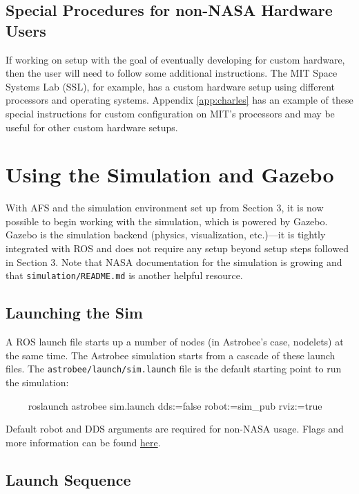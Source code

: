 \documentclass{article}
\begin{document}
\subsection{Special Procedures for non-NASA Hardware Users}

If working on setup with the goal of eventually developing for custom hardware, then the user will need to follow some additional instructions. The MIT Space Systems Lab (SSL), for example, has a custom hardware setup using different processors and operating systems. Appendix \ref{app:charles} has an example of these special instructions for custom configuration on MIT's processors and may be useful for other custom hardware setups. 

\newpage
\section{Using the Simulation and Gazebo}

With AFS and the simulation environment set up from Section 3, it is now possible to begin working with the simulation, which is powered by Gazebo. Gazebo is the simulation backend (physics, visualization, etc.)---it is tightly integrated with ROS and does not require any setup beyond setup steps followed in Section 3. Note that NASA documentation for the simulation is growing and that \texttt{simulation/README.md} is another helpful resource.


\subsection{Launching the Sim}

A ROS launch file starts up a number of nodes (in Astrobee's case, nodelets) at the same time. The Astrobee simulation starts from a cascade of these launch files. The \texttt{astrobee/launch/sim.launch} file is the default starting point to run the simulation:

\begin{markdown}
~~~~
roslaunch astrobee sim.launch dds:=false robot:=sim_pub rviz:=true
~~~~
\end{markdown}

Default robot and DDS arguments are required for non-NASA usage. Flags and more information can be found \href{https://github.com/nasa/astrobee/blob/master/simulation/sim\_overview.md}{here}.


\subsection{Launch Sequence}
\end{document}
